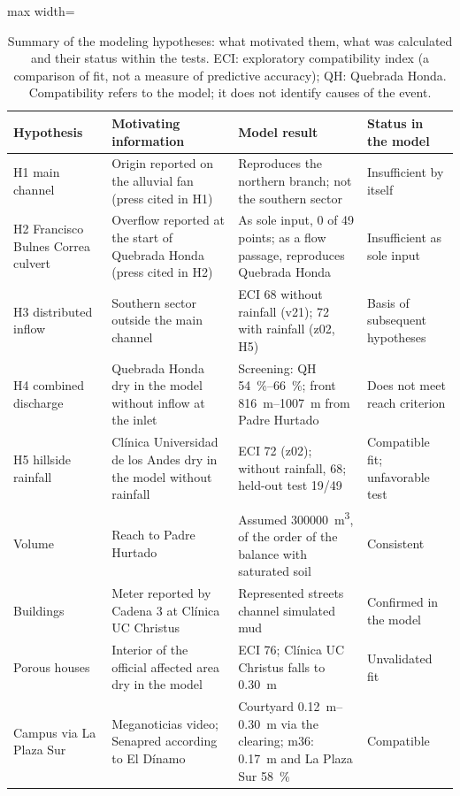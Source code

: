 \begin{table}[htbp]\centering\small
\caption{Summary of the modeling hypotheses: what motivated them, what was calculated and their status within the tests. ECI: exploratory compatibility index (a comparison of fit, not a measure of predictive accuracy); QH: Quebrada Honda. Compatibility refers to the model; it does not identify causes of the event.}\label{tab:recorrido}
\begin{adjustbox}{max width=\textwidth}\begin{tabular}{@{}>{\raggedright\arraybackslash}p{}>{\raggedright\arraybackslash}p{}>{\raggedright\arraybackslash}p{}>{\raggedright\arraybackslash}p{}@{}}\toprule
Hypothesis & Motivating information & Model result & Status in the model\\\midrule
H1 main channel & Origin reported on the alluvial fan (press cited in H1) & Reproduces the northern branch; not the southern sector & Insufficient by itself\\
H2 Francisco Bulnes Correa culvert & Overflow reported at the start of Quebrada Honda (press cited in H2) & As sole input, 0 of 49 points; as a flow passage, reproduces Quebrada Honda & Insufficient as sole input\\
H3 distributed inflow & Southern sector outside the main channel & ECI 68 without rainfall (v21); 72 with rainfall (z02, H5) & Basis of subsequent hypotheses\\
H4 combined discharge & Quebrada Honda dry in the model without inflow at the inlet & Screening: QH \SIrange{54}{66}{\percent}; front \SIrange{816}{1007}{m} from Padre Hurtado & Does not meet reach criterion\\
H5 hillside rainfall & Clínica Universidad de los Andes dry in the model without rainfall & ECI 72 (z02); without rainfall, 68; held-out test 19/49 & Compatible fit; unfavorable test\\
Volume & Reach to Padre Hurtado & Assumed \SI{300000}{m^3}, of the order of the balance with saturated soil & Consistent\\
Buildings & Meter reported by Cadena 3 at Clínica UC Christus & Represented streets channel simulated mud & Confirmed in the model\\
Porous houses & Interior of the official affected area dry in the model & ECI 76; Clínica UC Christus falls to \SI{0.30}{m} & Unvalidated fit\\
Campus via La Plaza Sur & Meganoticias video; Senapred according to El Dínamo & Courtyard \SIrange{0.12}{0.30}{m} via the clearing; m36: \SI{0.17}{m} and La Plaza Sur \SI{58}{\percent} & Compatible\\

\end{tabular}
\end{adjustbox}
\end{table}
